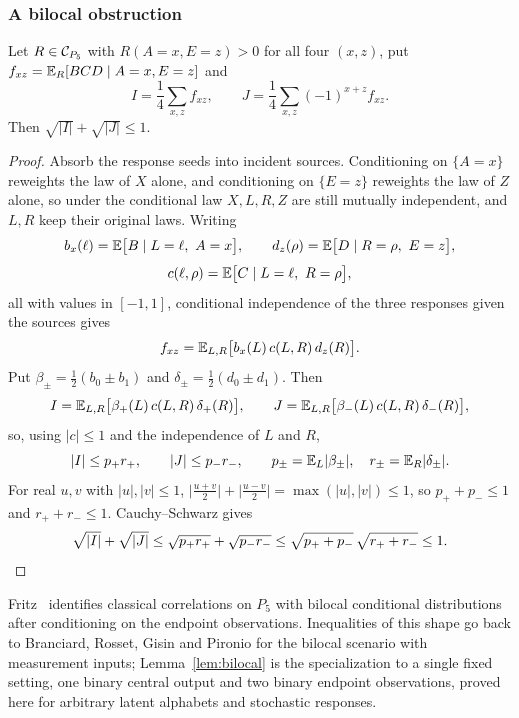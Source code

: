 \subsubsection{A bilocal obstruction}\label{sec:bilocal}

\begin{lemma}\label{lem:bilocal}
Let $R\in\mathcal C_{P_5}$ with $R(A=x,E=z)>0$ for all four $(x,z)$, put $f_{xz}=\mathbb E_R[BCD\mid A=x,E=z]$ and
\[
I=\frac14\sum_{x,z}f_{xz},\qquad J=\frac14\sum_{x,z}(-1)^{x+z}f_{xz}.
\]
Then $\sqrt{|I|}+\sqrt{|J|}\le1$.
\end{lemma}

\begin{proof}
Absorb the response seeds into incident sources. Conditioning on $\{A=x\}$ reweights the law of $X$ alone, and conditioning on $\{E=z\}$ reweights the law of $Z$ alone, so under the conditional law $X,L,R,Z$ are still mutually independent, and $L,R$ keep their original laws. Writing
\[
b_x(\ell)=\mathbb E\bigl[B\mid L=\ell,\ A=x\bigr],\qquad
d_z(\rho)=\mathbb E\bigl[D\mid R=\rho,\ E=z\bigr],
\]
\[
c(\ell,\rho)=\E\bigl[C\mid L=\ell,\ R=\rho\bigr],
\]
all with values in $[-1,1]$, conditional independence of the three responses given the sources gives
\[
f_{xz}=\mathbb E_{L,R}\bigl[b_x(L)\,c(L,R)\,d_z(R)\bigr].
\]
Put $\beta_\pm=\tfrac12(b_0\pm b_1)$ and $\delta_\pm=\tfrac12(d_0\pm d_1)$. Then
\[
I=\mathbb E_{L,R}\bigl[\beta_+(L)\,c(L,R)\,\delta_+(R)\bigr],\qquad
J=\mathbb E_{L,R}\bigl[\beta_-(L)\,c(L,R)\,\delta_-(R)\bigr],
\]
so, using $|c|\le1$ and the independence of $L$ and $R$,
\[
|I|\le p_+r_+,\qquad |J|\le p_-r_-,\qquad
p_\pm=\mathbb E_L|\beta_\pm|,\quad r_\pm=\mathbb E_R|\delta_\pm| .
\]
For real $u,v$ with $|u|,|v|\le1$,
$\bigl|\tfrac{u+v}2\bigr|+\bigl|\tfrac{u-v}2\bigr|=\max(|u|,|v|)\le1$,
so $p_++p_-\le1$ and $r_++r_-\le1$. Cauchy--Schwarz gives
\[
\sqrt{|I|}+\sqrt{|J|}\le\sqrt{p_+r_+}+\sqrt{p_-r_-}\le\sqrt{p_++p_-}\,\sqrt{r_++r_-}\le1 . \qedhere
\]
\end{proof}

Fritz~\cite[Theorem~2.9]{Fritz2012} identifies classical correlations on $P_5$ with bilocal conditional distributions after conditioning on the endpoint observations. Inequalities of this shape go back to Branciard, Rosset, Gisin and Pironio \cite{BranciardRossetGisinPironio2012} for the bilocal scenario with measurement inputs; Lemma~\ref{lem:bilocal} is the specialization to a single fixed setting, one binary central output and two binary endpoint observations, proved here for arbitrary latent alphabets and stochastic responses.

